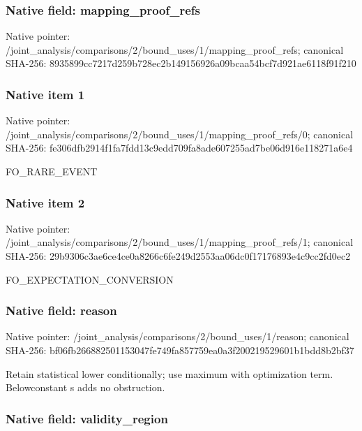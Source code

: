 \documentclass[10pt,a4paper]{article}
\begin{document}
\subsubsection{Native field: mapping\_proof\_refs}


Native pointer: /joint\_analysis/comparis\allowbreak{}ons/2/bound\_uses/1/mappi\allowbreak{}ng\_proof\_refs; canonical SHA-256: 8935899cc7217d259b728ec2\allowbreak{}b149156926a09bcaa54bcf7d\allowbreak{}921ae6118f91f210



\subsubsection{Native item 1}


Native pointer: /joint\_analysis/comparis\allowbreak{}ons/2/bound\_uses/1/mappi\allowbreak{}ng\_proof\_refs/0; canonical SHA-256: fe306dfb2914f1fa7fdd13c9\allowbreak{}edd709fa8ade607255ad7be0\allowbreak{}6d916e118271a6e4


FO\_RARE\_EVENT


\subsubsection{Native item 2}


Native pointer: /joint\_analysis/comparis\allowbreak{}ons/2/bound\_uses/1/mappi\allowbreak{}ng\_proof\_refs/1; canonical SHA-256: 29b9306c3ae6ce4ce0a8266c\allowbreak{}6fe249d2553aa06dc0f17176\allowbreak{}893e4c9cc2fd0ec2


FO\_EXPECTATION\_CONVERSION


\subsubsection{Native field: reason}


Native pointer: /joint\_analysis/comparis\allowbreak{}ons/2/bound\_uses/1/reaso\allowbreak{}n; canonical SHA-256: bf06fb266882501153047fe7\allowbreak{}49fa857759ea0a3f20021952\allowbreak{}9601b1bdd8b2bf37


Retain statistical lower conditionally; use maximum with optimization term. Belowconstant s adds no obstruction.


\subsubsection{Native field: validity\_region}
\end{document}
